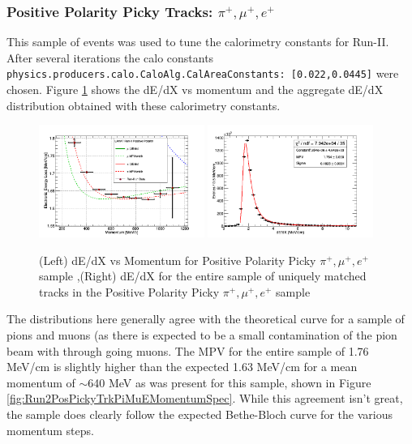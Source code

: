 \subsubsection{Positive Polarity Picky Tracks: $\pi^{+}, \mu^{+}, e^{+}$}\label{sec:Run2PosPickyTrkPiMuE}

This sample of events was used to tune the calorimetry constants for Run-II. After several iterations the calo constants \verb!physics.producers.calo.CaloAlg.CalAreaConstants: [0.022,0.0445]! were chosen. Figure \ref{fig:Run2PosPickyTrkPiMuEResults} shows the dE/dX vs momentum and the aggregate dE/dX distribution obtained with these calorimetry constants.

\begin{figure}[htb]
\centering
\includegraphics[width=0.48\textwidth]{images/dEdXvsMomentumPosPolRun2FineBin.png}
\includegraphics[width=0.48\textwidth]{images/dEdXPosPolRun2.png}
\caption{(Left) dE/dX vs Momentum for Positive Polarity Picky $\pi^{+}, \mu^{+}, e^{+}$ sample ,(Right) dE/dX for the entire sample of uniquely matched tracks in the Positive Polarity Picky $\pi^{+}, \mu^{+}, e^{+}$ sample }
\label{fig:Run2PosPickyTrkPiMuEResults}
\end{figure}

The distributions here generally agree with the theoretical curve for a sample of pions and muons (as there is expected to be a small contamination of the pion beam with through going muons. The MPV for the entire sample of 1.76 MeV/cm is slightly higher than the expected 1.63 MeV/cm for a mean momentum of $\sim$640 MeV as was present for this sample, shown in Figure \ref{fig:Run2PosPickyTrkPiMuEMomentumSpec}. While this agreement isn't great, the sample does clearly follow the expected Bethe-Bloch curve for the various momentum steps.

